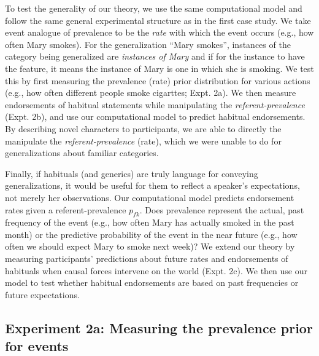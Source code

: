\documentclass[english,floatsintext,man]{apa6}
\theoremstyle{definition}
\theoremstyle{definition}
\theoremstyle{definition}
\theoremstyle{remark}
\begin{document}
To test the generality of our theory, we use the same computational
model and follow the same general experimental structure as in the first
case study. We take event analogue of prevalence to be the \emph{rate}
with which the event occurs (e.g., how often Mary smokes). For the
generalization \enquote{Mary smokes}, instances of the category being
generalized are \emph{instances of Mary} and if for the instance to have
the feature, it means the instance of Mary is one in which she is
smoking. We test this by first measuring the prevalence (rate) prior
distribution for various actions (e.g., how often different people smoke
cigarttes; Expt. 2a). We then measure endorsements of habitual
statements while manipulating the \emph{referent-prevalence} (Expt. 2b),
and use our computational model to predict habitual endorsements. By
describing novel characters to participants, we are able to directly the
manipulate the \emph{referent-prevalence} (rate), which we were unable
to do for generalizations about familiar categories.

Finally, if habituals (and generics) are truly language for conveying
generalizations, it would be useful for them to reflect a speaker's
expectations, not merely her observations. Our computational model
predicts endorsement rates given a referent-prevalence \(p_{fk}\). Does
prevalence represent the actual, past frequency of the event (e.g., how
often Mary has actually smoked in the past month) or the predictive
probability of the event in the near future (e.g., how often we should
expect Mary to smoke next week)? We extend our theory by measuring
participants' predictions about future rates and endorsements of
habituals when causal forces intervene on the world (Expt. 2c). We then
use our model to test whether habitual endorsements are based on past
frequencies or future expectations.

\subsection{Experiment 2a: Measuring the prevalence prior for
events}\label{experiment-2a-measuring-the-prevalence-prior-for-events}
\end{document}
